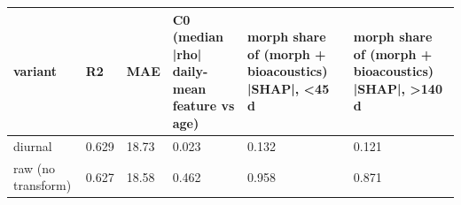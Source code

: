 \begin{tabular}{llllll}
\hline
variant & R2 & MAE & C0 (median |rho| daily-mean feature vs age) & morph share of (morph + bioacoustics) |SHAP|, <45 d & morph share of (morph + bioacoustics) |SHAP|, >140 d \\
\hline
diurnal & 0.629 & 18.73 & 0.023 & 0.132 & 0.121 \\
raw (no transform) & 0.627 & 18.58 & 0.462 & 0.958 & 0.871 \\
\hline
\end{tabular}
